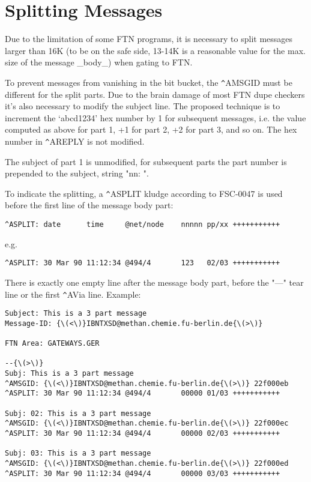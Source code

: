 \documentclass{article}
\begin{document}
\section{Splitting Messages }



Due to the limitation of some FTN programs, it is necessary to split messages larger than 16K (to be on the safe side, 13-14K is a reasonable value for the max. size of the message \_body\_) when gating to FTN.

To prevent messages from vanishing in the bit bucket, the \verb+^+AMSGID must be different for the split parts. Due to the brain damage of most FTN dupe checkers it's also necessary to modify the subject line.  The proposed technique is to increment the `abcd1234' hex number by 1 for subsequent messages, i.e. the value computed as above for part 1, +1 for part 2, +2 for part 3, and so on. The hex number in \verb+^+AREPLY is not modified.

The subject of part 1 is unmodified, for subsequent parts the part number is prepended to the subject, string "nn: ".

To indicate the splitting, a \verb+^+ASPLIT kludge according to FSC-0047 is used before the first line of the message body part:   
\begin{verbatim}
^ASPLIT: date      time     @net/node    nnnnn pp/xx +++++++++++ 
\end{verbatim}


e.g. 
\begin{verbatim}
^ASPLIT: 30 Mar 90 11:12:34 @494/4       123   02/03 +++++++++++ 
\end{verbatim}


There is exactly one empty line after the message body part, before the "---" tear line or the first \verb+^+AVia line.  Example:   
\begin{verbatim}
Subject: This is a 3 part message 
Message-ID: {\(<\)}IBNTXSD@methan.chemie.fu-berlin.de{\(>\)} 
 
FTN Area: GATEWAYS.GER 
 
--{\(>\)} 
Subj: This is a 3 part message 
^AMSGID: {\(<\)}IBNTXSD@methan.chemie.fu-berlin.de{\(>\)} 22f000eb 
^ASPLIT: 30 Mar 90 11:12:34 @494/4       00000 01/03 +++++++++++ 
 
Subj: 02: This is a 3 part message 
^AMSGID: {\(<\)}IBNTXSD@methan.chemie.fu-berlin.de{\(>\)} 22f000ec 
^ASPLIT: 30 Mar 90 11:12:34 @494/4       00000 02/03 +++++++++++ 
 
Subj: 03: This is a 3 part message 
^AMSGID: {\(<\)}IBNTXSD@methan.chemie.fu-berlin.de{\(>\)} 22f000ed 
^ASPLIT: 30 Mar 90 11:12:34 @494/4       00000 03/03 +++++++++++ 
\end{verbatim}
\end{document}
